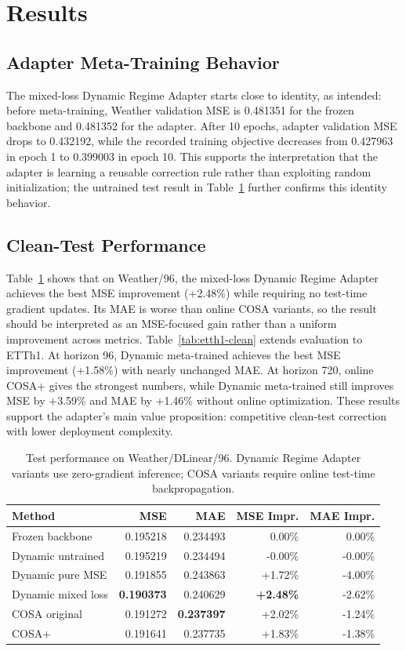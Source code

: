 \documentclass[10pt]{article}
\begin{document}
\section{Results}
\subsection{Adapter Meta-Training Behavior}
The mixed-loss Dynamic Regime Adapter starts close to identity, as intended: before meta-training, Weather validation MSE is 0.481351 for the frozen backbone and 0.481352 for the adapter. After 10 epochs, adapter validation MSE drops to 0.432192, while the recorded training objective decreases from 0.427963 in epoch 1 to 0.399003 in epoch 10. This supports the interpretation that the adapter is learning a reusable correction rule rather than exploiting random initialization; the untrained test result in Table~\ref{tab:weather-clean} further confirms this identity behavior.

\subsection{Clean-Test Performance}
Table~\ref{tab:weather-clean} shows that on Weather/96, the mixed-loss Dynamic Regime Adapter achieves the best MSE improvement (+2.48\%) while requiring no test-time gradient updates. Its MAE is worse than online COSA variants, so the result should be interpreted as an MSE-focused gain rather than a uniform improvement across metrics. Table~\ref{tab:etth1-clean} extends evaluation to ETTh1. At horizon 96, Dynamic meta-trained achieves the best MSE improvement (+1.58\%) with nearly unchanged MAE. At horizon 720, online COSA+ gives the strongest numbers, while Dynamic meta-trained still improves MSE by +3.59\% and MAE by +1.46\% without online optimization. These results support the adapter's main value proposition: competitive clean-test correction with lower deployment complexity.

\begin{table}[H]
\centering
\small
\caption{Test performance on Weather/DLinear/96. Dynamic Regime Adapter variants use zero-gradient inference; COSA variants require online test-time backpropagation.}
\label{tab:weather-clean}
\begin{tabular}{lrrrr}
\toprule
Method & MSE & MAE & MSE Impr. & MAE Impr. \\
\midrule
Frozen backbone & 0.195218 & 0.234493 & 0.00\% & 0.00\% \\
Dynamic untrained & 0.195219 & 0.234494 & -0.00\% & -0.00\% \\
Dynamic pure MSE & 0.191855 & 0.243863 & +1.72\% & -4.00\% \\
Dynamic mixed loss & \textbf{0.190373} & 0.240629 & \textbf{+2.48\%} & -2.62\% \\
COSA original & 0.191272 & \textbf{0.237397} & +2.02\% & -1.24\% \\
COSA+ & 0.191641 & 0.237735 & +1.83\% & -1.38\% \\
\bottomrule
\end{tabular}
\end{table}
\end{document}
